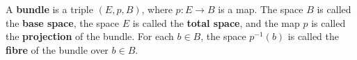 A \textbf{bundle} is a triple $(E, p, B)$, where $p: E \rightarrow B$ is a map. The space $B$ is called the \textbf{base space}, the space $E$ is called the \textbf{total space}, and the map $p$ is called the \textbf{projection} of the bundle. For each $b \in B$, the space $p^{-1}(b)$ is called the \textbf{fibre} of the bundle over $b \in B$.
